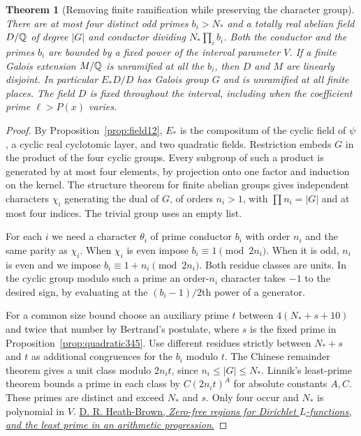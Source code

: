 \documentclass[a4paper,11pt]{article}
\newtheorem{theorem}[proposition]{Theorem}
\theoremstyle{definition}
\theoremstyle{remark}
\numberwithin{equation}{section}
\begin{document}
\begin{theorem}[Removing finite ramification while preserving the character group]\leavevmode
\label{thm:realtwist404}
There are at most four distinct odd primes \(b_i>N_*\) and a
totally real abelian field \(D/\mathbb Q\) of degree \(|G|\) and conductor
dividing \(N_*\prod_i b_i\). Both the conductor and the primes
\(b_i\) are bounded by a fixed power of the interval parameter
\(V\). If a finite Galois extension \(M/\mathbb Q\) is unramified at all
the \(b_i\), then \(D\) and \(M\) are linearly disjoint. In
particular \(E_*D/D\) has Galois group \(G\) and is unramified
at all finite places. The field \(D\) is fixed throughout the
interval, including when the coefficient prime \(\ell>P(x)\)
varies.
\end{theorem}
\begin{proof}
By Proposition~\ref{prop:field12}, \(E_*\) is the compositum of
the cyclic field of \(\psi\), a cyclic real cyclotomic layer, and
two quadratic fields. Restriction embeds \(G\) in the product
of the four cyclic groups. Every subgroup of such a product
is generated by at most four elements, by projection onto one
factor and induction on the kernel. The structure theorem for
finite abelian groups gives independent characters
\(\chi_i\) generating the dual of \(G\), of orders \(n_i>1\),
with \(\prod n_i=|G|\) and at most four indices. The trivial
group uses an empty list.

For each \(i\) we need a character \(\theta_i\) of prime conductor
\(b_i\) with order \(n_i\) and the same parity as \(\chi_i\).
When \(\chi_i\) is even impose \(b_i\equiv1\pmod{2n_i}\).
When it is odd, \(n_i\) is even and we impose
\(b_i\equiv1+n_i\pmod{2n_i}\). Both residue classes are units.
In the cyclic group modulo such a prime an order-\(n_i\)
character takes \(-1\) to the desired sign, by evaluating at
the \((b_i-1)/2\)th power of a generator.

For a common size bound choose an auxiliary prime \(t\) between
\(4(N_*+s+10)\) and twice that number by Bertrand's postulate,
where \(s\) is the fixed prime in Proposition~\ref{prop:quadratic345}.
Use different residues strictly between \(N_*+s\) and \(t\) as
additional congruences for the \(b_i\) modulo \(t\). The Chinese
remainder theorem gives a unit class modulo \(2n_i t\), since
\(n_i\le |G|\le N_*\). Linnik's least-prime theorem bounds a
prime in each class by \(C(2n_i t)^A\) for absolute constants
\(A,C\). These primes are distinct and exceed \(N_*\) and \(s\).
Only four occur and \(N_*\) is polynomial in \(V\).
\href{https://academic.oup.com/plms/article-abstract/s3-64/2/265/1528322}{D. R. Heath-Brown,
\emph{Zero-free regions for Dirichlet \(L\)-functions, and the
least prime in an arithmetic progression}.}


\end{proof}
\end{document}
